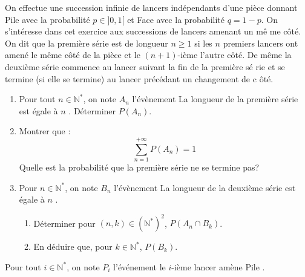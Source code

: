 \documentclass[a4paper,10pt]{report}
\begin{document}
\begin{Exa} On effectue une succession infinie de lancers indépendants d'une pièce
donnant Pile avec la probabilité $p\in ]0,1[$ et Face avec la probabilité $%
q=1-p$.\newline
On s'intéresse dans cet exercice aux successions de lancers amenant un mê%
me côté.\newline
On dit que la première série est de longueur $n\geq 1$ si les $n$
premiers lancers ont amené le même côté de la pièce et le $(n+1)$-ième
l'autre côté.\newline
De même la deuxième série commence au lancer suivant la fin de la première sé%
rie et se termine (si elle se termine) au lancer précédant un changement de c%
ôté.\newline


\begin{enumerate}
\item Pour tout $n \in \mathbb{N}^*$, on note $A_n$ l'évènement \og La longueur de la première série est égale à $n$ \fg. Déterminer $P(A_n)$.
\item Montrer que :
\[\sum\limits_{n=1}^{+\infty }P(A_n)=1\]
Quelle est la probabilité que la première série ne se termine pas?

\item Pour $n \in \mathbb{N}^*$, on note $B_n$ l'évènement \og La longueur de la deuxième série est égale à $n$ \fg .

\begin{enumerate}
\item Déterminer pour $(n,k) \in (\mathbb{N}^*)^2$, $P(A_n \cap B_k)$.

\item En déduire que, pour $k\in \mathbb{N}^{* }$, $P(B_k)$.
\end{enumerate}
\end{enumerate}
\end{Exa}

\corr Pour tout $i\in \mathbb{N}^{* }$, on note $P_{i}$ l'événement \og le $i$-ième lancer amène Pile \fg.
\end{document}
